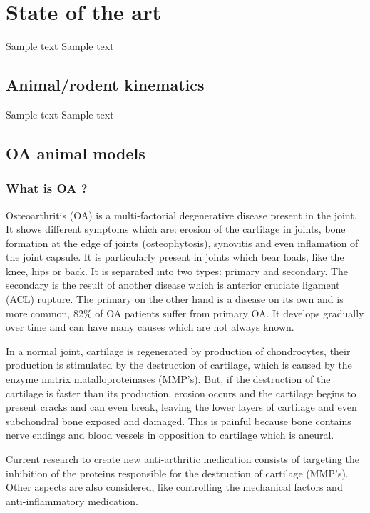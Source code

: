 \chapter{State of the art}

Sample text Sample text

\section{Animal/rodent kinematics}

Sample text Sample text

\section{OA animal models}

\subsection{What is OA ? \cite{OA1}}


Osteoarthritis (OA) is a multi-factorial degenerative disease present in the joint. It shows different symptoms which are: erosion of the cartilage in joints, bone formation at the edge of joints (osteophytosis), synovitis and even inflamation of the joint capsule. It is particularly present in joints which bear loads, like the knee, hips or back. It is separated into two types: primary and secondary. The secondary is the result of another disease which is anterior cruciate ligament (ACL) rupture. The primary on the other hand is a disease on its own and is more common, 82\% of OA patients suffer from primary OA. It develops gradually over time and can have many causes which are not always known.

In a normal joint, cartilage is regenerated by production of chondrocytes, their production is stimulated by the destruction of cartilage, which is caused by the enzyme matrix matalloproteinases (MMP's). But, if the destruction of the cartilage is faster than its production, erosion occurs and the cartilage begins to present cracks and can even break, leaving the lower layers of cartilage and even subchondral bone exposed and damaged. This is painful because bone contains nerve endings and blood vessels in opposition to cartilage which is aneural.

Current research to create new anti-arthritic medication consists of targeting the inhibition of the proteins responsible for the destruction of cartilage (MMP's). Other aspects are also considered, like controlling the mechanical factors and anti-inflammatory medication.

